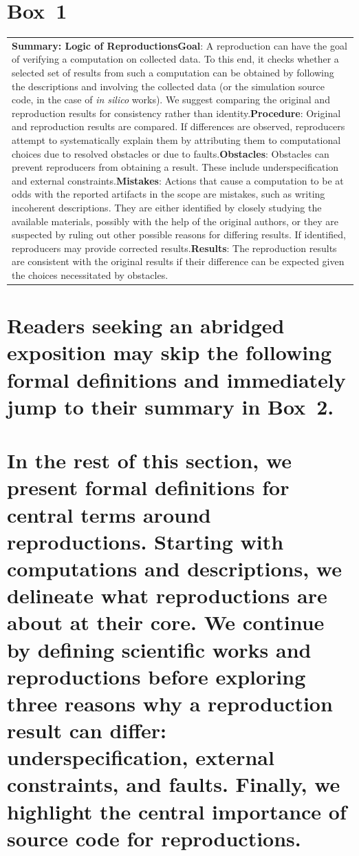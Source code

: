 \documentclass[authordate, empirical]{jote-new-article}
\begin{document}
	\section{\textbf{Box 1}}

	\begin{table}
		\begin{tabularx}{\linewidth}{@{} l @{}}
			\hline \textbf{Summary: Logic of Reproductions}\textbf{Goal}: A reproduction can have the goal of verifying a computation on collected data. To this end, it checks whether a selected set of results from such a computation can be obtained by following the descriptions and involving the collected data (or the simulation source code, in the case of \emph{in silico} works). We suggest comparing the original and reproduction results for consistency rather than identity.\textbf{Procedure}: Original and reproduction results are compared. If differences are observed, reproducers attempt to systematically explain them by attributing them to computational choices due to resolved obstacles or due to faults.\textbf{Obstacles}: Obstacles can prevent reproducers from obtaining a result. These include underspecification and external constraints.\textbf{Mistakes}: Actions that cause a computation to be at odds with the reported artifacts in the scope are mistakes, such as writing incoherent descriptions. They are either identified by closely studying the available materials, possibly with the help of the original authors, or they are suspected by ruling out other possible reasons for differing results. If identified, reproducers may provide corrected results.\textbf{Results}: The reproduction results are consistent with the original results if their difference can be expected given the choices necessitated by obstacles.
			\\


		\end{tabularx}
	\end{table}

	\section{Readers seeking an abridged exposition may skip the following formal definitions and immediately jump to their summary in Box 2.}



	\section{In the rest of this section, we present formal definitions for central terms around reproductions. Starting with computations and descriptions, we delineate what reproductions are about at their core. We continue by defining scientific works and reproductions before exploring three reasons why a reproduction result can differ: underspecification, external constraints, and faults. Finally, we highlight the central importance of source code for reproductions.}
\end{document}
